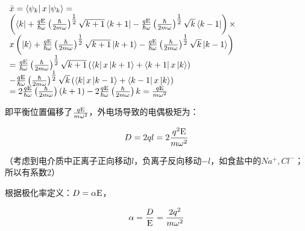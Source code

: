 $\begin{array}{l}
 \bar x = \left\langle {\psi _k } \right|x\left| {\psi _k } \right\rangle  = \\
 \left( {\left\langle k \right| + \frac{{q{\rm E}}}{{\hbar \omega }}\left( {\frac{\hbar }{{2m\omega }}} \right)^{{\textstyle{1 \over 2}}} \sqrt {k + 1} \left\langle {k + 1} \right| - \frac{{q{\rm E}}}{{\hbar \omega }}\left( {\frac{\hbar }{{2m\omega }}} \right)^{{\textstyle{1 \over 2}}} \sqrt k \left\langle {k - 1} \right|} \right) \times  \\
 x\left( {\left| k \right\rangle  + \frac{{q{\rm E}}}{{\hbar \omega }}\left( {\frac{\hbar }{{2m\omega }}} \right)^{{\textstyle{1 \over 2}}} \sqrt {k + 1} \left| {k + 1} \right\rangle  - \frac{{q{\rm E}}}{{\hbar \omega }}\left( {\frac{\hbar }{{2m\omega }}} \right)^{{\textstyle{1 \over 2}}} \sqrt k \left| {k - 1} \right\rangle } \right) \\
  = \frac{{q{\rm E}}}{{\hbar \omega }}\left( {\frac{\hbar }{{2m\omega }}} \right)^{{\textstyle{1 \over 2}}} \sqrt {k + 1}  \left( {\left\langle k \right|x\left| {k + 1} \right\rangle  + \left\langle {k + 1} \right|x\left| k \right\rangle } \right)  \\ 
- \frac{{q{\rm E}}}{{\hbar \omega }}\left( {\frac{\hbar }{{2m\omega }}} \right)^{{\textstyle{1 \over 2}}} \sqrt k \left( {\left\langle k \right|x\left| {k - 1} \right\rangle  + \left\langle {k - 1} \right|x\left| k \right\rangle } \right) \\
  = 2\frac{{q{\rm E}}}{{\hbar \omega }}\left( {\frac{\hbar }{{2m\omega }}} \right)\left( {k + 1} \right) - 2\frac{{q{\rm E}}}{{\hbar \omega }}\left( {\frac{\hbar }{{2m\omega }}} \right)k = \frac{{q{\rm E}}}{{m\omega ^2 }} \\
 \end{array}$


即平衡位置偏移了$\frac{{q{\rm E}}}{{m\omega ^2 }}$，外电场导致的电偶极矩为：

\begin{equation}
D = 2ql = 2\frac{{q^2 {\rm E}}}{{m\omega ^2 }}
\end{equation}

（考虑到电介质中正离子正向移动$l$，负离子反向移动$-l$，如食盐中的$Na^ +  ,Cl^ -  $；所以有系数2）


根据极化率定义：$D = \alpha {\rm E}$，

\begin{equation}
\alpha  = \frac{D}{{\rm E}} = \frac{{2q^2 }}{{m\omega ^2 }}
\end{equation}

